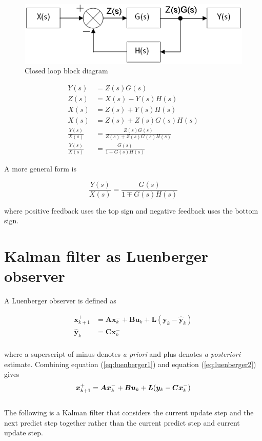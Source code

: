 \documentclass[10pt,conference,compsoc]{IEEEtran}
\newcommand{\mtx}[1] {\bm #1}
\begin{document}
\begin{figure}[H]
  \includegraphics[width=\linewidth]{figs/Closed_Loop_Block_Deriv.png}
  \caption{Closed loop block diagram \cite{bib:closed_loop_block_derivation}}
  \label{fig:closed_loop_deriv}
\end{figure}

\begin{align}
  Y(s) &= Z(s) G(s) \nonumber \\
  Z(s) &= X(s) - Y(s) H(s) \nonumber \\
  X(s) &= Z(s) + Y(s) H(s) \nonumber \\
  X(s) &= Z(s) + Z(s) G(s) H(s) \nonumber \\
  \frac{Y(s)}{X(s)} &= \frac{Z(s) G(s)}{Z(s) + Z(s) G(s) H(s)} \nonumber \\
  \frac{Y(s)}{X(s)} &= \frac{G(s)}{1 + G(s) H(s)}
\end{align}

A more general form is

\begin{equation}
  \frac{Y(s)}{X(s)} = \frac{G(s)}{1 \mp G(s) H(s)}
\end{equation}

where positive feedback uses the top sign and negative feedback uses the bottom
sign.

\section{Kalman filter as Luenberger observer} \label{sec:app_kalman_luenberger}

A Luenberger observer is defined as

\begin{align}
  \mtx{x}_{k+1}^+ &= \mtx{A} \mtx{x}_k^- + \mtx{B} \mtx{u}_k + \mtx{L}
    (\mtx{y}_k - \hat{\mtx{y}}_k) \label{eq:luenberger1} \\
  \hat{\mtx{y}}_k &= \mtx{C} \mtx{x}_k^- \label{eq:luenberger2} \\ \nonumber
\end{align}

where a superscript of minus denotes \textit{a priori} and plus denotes
\textit{a posteriori} estimate. Combining equation (\ref{eq:luenberger1}) and
equation (\ref{eq:luenberger2}) gives \\
\begin{equation} \label{eq:luenberger}
  \mtx{x}_{k+1}^+ = \mtx{A} \mtx{x}_k^- + \mtx{B} \mtx{u}_k + \mtx{L}
    (\mtx{y}_k - \mtx{C} \mtx{x}_k^-) \\
\end{equation}
\\
The following is a Kalman filter that considers the current update step and the
next predict step together rather than the current predict step and current
update step.
\end{document}

